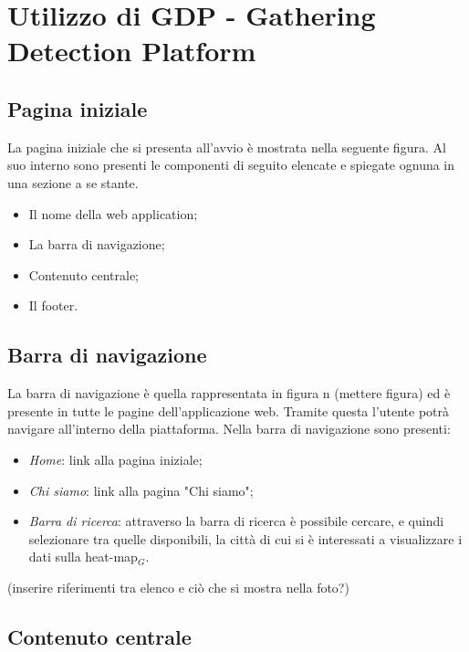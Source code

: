 \chapter{Utilizzo di GDP - Gathering Detection Platform}\label{UtilizzoDiGDPGatheringDetecionPlatform}

\section{Pagina iniziale}\label{UtilizzoDiGDPGatheringDetecionPlatformPaginaIniziale}
La pagina iniziale che si presenta all'avvio è mostrata nella seguente figura.
Al suo interno sono presenti le componenti di seguito elencate e spiegate ognuna in una sezione a se stante.
\begin{itemize}
	\item Il nome della web application;
	\item La barra di navigazione;
	\item Contenuto centrale;
	\item Il footer.
\end{itemize}

\section{Barra di navigazione}\label{UtilizzoDiGDPGatheringDetecionPlatformBarraDiNavigazione}

La barra di navigazione è quella rappresentata in figura n (mettere figura) ed è presente in tutte le pagine dell'applicazione web. Tramite questa l'utente potrà navigare all'interno della piattaforma. Nella barra di navigazione sono presenti:
\begin{itemize}
	\item \textit{Home}: link alla pagina iniziale;
	\item \textit{Chi siamo}: link alla pagina "Chi siamo";
	\item \textit{Barra di ricerca}: attraverso la barra di ricerca è possibile cercare, e quindi selezionare tra quelle disponibili, la città di cui si è interessati a visualizzare i dati sulla heat-map$_G$. 
\end{itemize}
(inserire riferimenti tra elenco e ciò che si mostra nella foto?)

\section{Contenuto centrale}\label{UtilizzoDiGDPGatheringDetecionPlatformContenutoCentrale}
